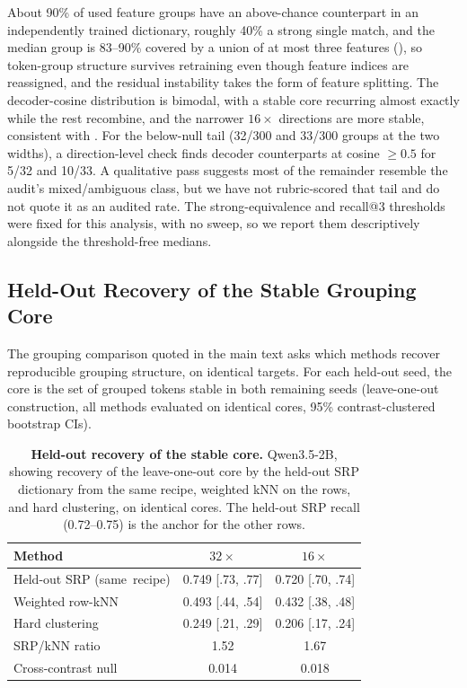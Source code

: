 About 90\% of used feature groups have an above-chance counterpart in an
independently trained dictionary, roughly 40\% a strong single
match, and the median group is 83--90\% covered by a union of at most
three features (), so token-group
structure survives retraining even though feature indices are reassigned,
and the residual instability takes the form of feature
splitting. The decoder-cosine
distribution is bimodal, with a stable core recurring almost exactly
while the rest recombine, and the narrower \(16\times\) directions are more stable,
consistent with \citet{paulo2025stability}. For the below-null tail
(32/300 and 33/300 groups at the two widths), a direction-level check
finds decoder counterparts at cosine \(\ge 0.5\) for 5/32 and 10/33. A
qualitative pass suggests most of the remainder resemble the audit's
mixed/ambiguous class, but we have not rubric-scored that tail and do
not quote it as an audited rate. The strong-equivalence and recall@3
thresholds were fixed for this analysis, with no sweep, so we
report them descriptively alongside the threshold-free medians.

\subsection{Held-Out Recovery of the Stable Grouping Core}
\label{app:basis-stability-loo}

The grouping comparison quoted in the main text asks which methods
recover reproducible grouping structure, on identical targets. For each
held-out seed, the core is the set of grouped tokens stable in
both remaining seeds (leave-one-out construction, all methods evaluated
on identical cores, 95\% contrast-clustered bootstrap CIs).

\begin{table}[!tbp]
\caption{\textbf{Held-out recovery of the stable core.}
Qwen3.5-2B, showing recovery of the leave-one-out core by the held-out
SRP dictionary from the same recipe, weighted kNN on the rows, and hard clustering, on
identical cores. The held-out SRP recall (0.72--0.75) is the anchor
for the other rows.}
\label{tab:app-loo-core-recovery}
\centering
\footnotesize
\setlength{\tabcolsep}{4pt}
\renewcommand{\arraystretch}{1.08}
\begin{tabularx}{\linewidth}{@{}>{\RaggedRight\arraybackslash}Xcc@{}}
\toprule
Method & \(32\times\) & \(16\times\) \\
\midrule
Held-out SRP \mbox{(same recipe)} & 0.749 [.73, .77] & 0.720 [.70, .74] \\
Weighted row-kNN & 0.493 [.44, .54] & 0.432 [.38, .48] \\
Hard clustering & 0.249 [.21, .29] & 0.206 [.17, .24] \\
\midrule
SRP/kNN ratio & 1.52 & 1.67 \\
Cross-contrast null & 0.014 & 0.018 \\
\bottomrule
\end{tabularx}
\end{table}

